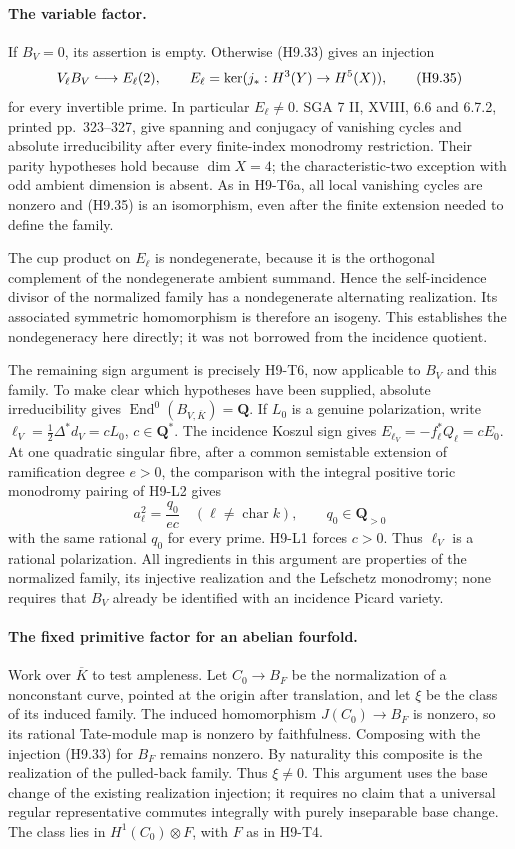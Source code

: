 \paragraph{The variable factor.}
If $B_V=0$, its assertion is empty. Otherwise (H9.33) gives an injection
\[
 V_\ell B_V\lhook\joinrel\longrightarrow E_\ell(2),
 \qquad E_\ell=\ker(j_*:H^3(Y)\to H^5(X)),                  \tag{H9.35}
\]
for every invertible prime. In particular $E_\ell\ne0$. SGA 7 II,
XVIII, 6.6 and 6.7.2, printed pp.~323--327, give spanning and conjugacy
of vanishing cycles and absolute irreducibility after every finite-index
monodromy restriction. Their parity hypotheses hold because $\dim X=4$;
the characteristic-two exception with odd ambient dimension is absent.
As in H9-T6a, all local vanishing cycles are nonzero and (H9.35) is an
isomorphism, even after the finite extension needed to define the family.

The cup product on $E_\ell$ is nondegenerate, because it is the
orthogonal complement of the nondegenerate ambient summand. Hence the
self-incidence divisor of the normalized family has a nondegenerate
alternating realization. Its associated symmetric homomorphism is
therefore an isogeny. This establishes the nondegeneracy here directly;
it was not borrowed from the incidence quotient.

The remaining sign argument is precisely H9-T6, now applicable to
$B_V$ and this family. To make clear which hypotheses have been
supplied, absolute irreducibility gives
$\operatorname{End}^0(B_{V,\overline K})=\mathbf Q$. If $L_0$ is a
genuine polarization, write
$\ell_V=\tfrac12\Delta^*d_V=cL_0$, $c\in\mathbf Q^*$.
The incidence Koszul sign gives
$E_{\ell_V}=-f_\ell^*Q_\ell=cE_0$. At one quadratic singular fibre,
after a common semistable extension of ramification degree $e>0$,
the comparison with the integral positive toric monodromy pairing of
H9-L2 gives
\[
 a_\ell^2=\frac{q_0}{e c}\quad(\ell\ne\operatorname{char}k),
 \qquad q_0\in\mathbf Q_{>0}
\]
with the same rational $q_0$ for every prime. H9-L1 forces $c>0$.
Thus $\ell_V$ is a rational polarization. All ingredients in this
argument are properties of the normalized family, its injective
realization and the Lefschetz monodromy; none requires that $B_V$
already be identified with an incidence Picard variety.

\paragraph{The fixed primitive factor for an abelian fourfold.}
Work over $\overline K$ to test ampleness. Let $C_0\to B_F$ be the
normalization of a nonconstant curve, pointed at the origin after
translation, and let $\xi$ be the class of its induced family.
The induced homomorphism $J(C_0)\to B_F$ is nonzero, so its rational
Tate-module map is nonzero by faithfulness. Composing with the
injection (H9.33) for $B_F$ remains nonzero. By naturality this
composite is the realization of the pulled-back family. Thus
$\xi\ne0$. This argument uses the base change of the existing
realization injection; it requires no claim that a universal regular
representative commutes integrally with purely inseparable base change.
The class lies in $H^1(C_0)\otimes F$, with $F$ as in H9-T4.

